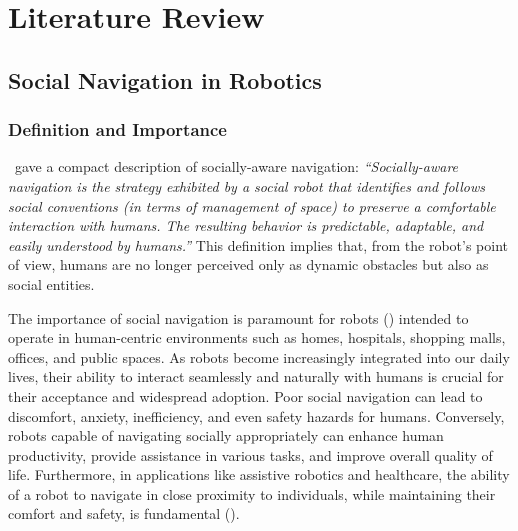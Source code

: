 
\chapter{Literature Review} %

\label{Chapter2} %


\section{Social Navigation in Robotics}

\subsection{Definition and Importance}
\cite{riosmartinez2015proxemics}\ gave a compact description of socially-aware navigation: 
\emph{``Socially-aware navigation is the strategy exhibited by a social robot that identifies 
and follows social conventions (in terms of management of space) to preserve a comfortable 
interaction with humans. The resulting behavior is predictable, adaptable, and easily 
understood by humans.''} This definition implies that, from the robot's point of view, 
humans are no longer perceived only as dynamic obstacles but also as social entities.

The importance of social navigation is paramount for robots (\cite{KRUSE20131726}) intended to operate in human-centric 
environments such as homes, hospitals, shopping malls, offices, and public spaces. 
As robots become increasingly integrated into our daily lives, their ability to interact seamlessly 
and naturally with humans is crucial for their acceptance and widespread adoption. Poor social 
navigation can lead to discomfort, anxiety, inefficiency, and even safety hazards for humans. 
Conversely, robots capable of navigating socially appropriately can enhance human productivity, 
provide assistance in various tasks, and improve overall quality of life. Furthermore, in 
applications like assistive robotics and healthcare, the ability of a robot to navigate in 
close proximity to individuals, while maintaining their comfort and safety, is fundamental (\cite{MOLLERsurvey}).


